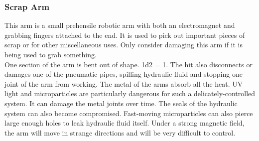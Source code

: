 \documentclass[a4paper]{article}
\begin{document}
\vspace{-0.5cm} \hspace{-18pt} \subsubsection{Scrap Arm} \label{outer_arm} \vspace{-0.2cm}
This arm is a small prehensile robotic arm with both an electromagnet and grabbing fingers attached to the end. It is used to pick out important pieces of scrap or for other miscellaneous uses. Only consider damaging this arm if it is being used to grab something.
\\ \pbhw
{}
{One section of the arm is bent out of shape. \newline \hspace{3pt} 1d2 = 1. The hit also disconnects or damages one of the pneumatic pipes, spilling hydraulic fluid and stopping one joint of the arm from working.}
{The metal of the arms absorb all the heat.}
{UV light and microparticles are particularly dangerous for such a delicately-controlled system. It can damage the metal joints over time. The seals of the hydraulic system can also become compromised. Fast-moving microparticles can also pierce large enough holes to leak hydraulic fluid itself. \newline \hspace*{3pt} Under a strong magnetic field, the arm will move in strange directions and will be very difficult to control.}
\end{document}
